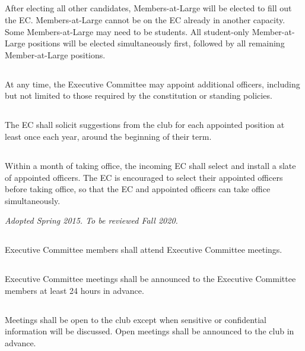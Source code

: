 \documentclass{bylaws}
\newcommand{\sptimes}[2]{\emph{Adopted #1. To be reviewed #2.}}
\begin{document}
\subsection{}After electing all other candidates, Members-at-Large will be elected to fill out the EC. Members-at-Large cannot be on the EC already in another capacity. Some Members-at-Large may need to be students. All student-only Member-at-Large positions will be elected simultaneously first, followed by all remaining Member-at-Large positions.


\subsection{}At any time, the Executive Committee may appoint additional officers, including but not limited to those required by the constitution or standing policies.
\subsection{}The EC shall solicit suggestions from the club for each appointed position at least once each year, around the beginning of their term.
\subsection{}Within a month of taking office, the incoming EC shall select and install a slate of appointed officers. The EC is encouraged to select their appointed officers before taking office, so that the EC and appointed officers can take office simultaneously.


\sptimes{Spring 2015}{Fall 2020}


\subsection{}Executive Committee members shall attend Executive Committee meetings.
\subsection{}Executive Committee meetings shall be announced to the Executive Committee members at least 24 hours in advance.
\subsection{}Meetings shall be open to the club except when sensitive or confidential information will be discussed. Open meetings shall be announced to the club in advance.
\end{document}
